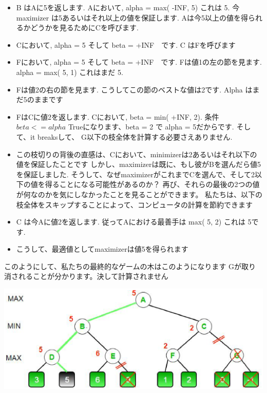 \documentclass[uplatex,a4paper,11pt,oneside,openany]{jsbook}
\begin{document}
\begin{itemize}
  \item B はAに5を返します. Aにおいて, alpha = max( -INF, 5) これは 5. 今 maximizer は5あるいはそれ以上の値を保証します.
  Aは今5以上の値を得られるかどうかを見るためにCを呼びます.
  \item Cにおいて, alpha = 5 そして beta = +INF　です. C はFを呼びます
  \item Fにおいて, alpha = 5 そして beta = +INF　です. Fは値1の左の節を見ます. alpha = max( 5, 1) これはまだ 5.
  \item Fは値2の右の節を見ます. こうしてこの節のベストな値は2です. Alpha はまだ5のままです
  \item FはCに値2を返します. Cにおいて, beta = min( +INF, 2). 条件 $beta <= alpha$ Trueになります、beta = 2 で alpha = 5だからです.
  そして、it breaksして、 G以下の枝全体を計算する必要さえありません.
  \item この枝切りの背後の直感は、Cにおいて、minimizerは2あるいはそれ以下の値を保証したことです
  しかし、maximizerは既に、もし彼がBを選んだら値5を保証しました.
  そうして、なぜmaximizerがこれまでCを選んで、そして2以下の値を得ることになる可能性があるのか？
  再び、それらの最後の2つの値が何なのかを気にしなかったことを見ることができます。
  私たちは、以下の枝全体をスキップすることによって、コンピュータの計算を節約できます
  \item C は今Aに値2を返します. 従ってAにおける最善手は max( 5, 2) これは 5です.
  \item こうして、最適値としてmaximizerは値5を得られます
\end{itemize}

このようにして、私たちの最終的なゲームの木はこのようになります
Gが取り消されることが分かります。決して計算されません

\begin{center}
  \includegraphics[width=0.8\hsize]{figures/eps/MIN_MAX3.eps}
\end{center}
\end{document}
